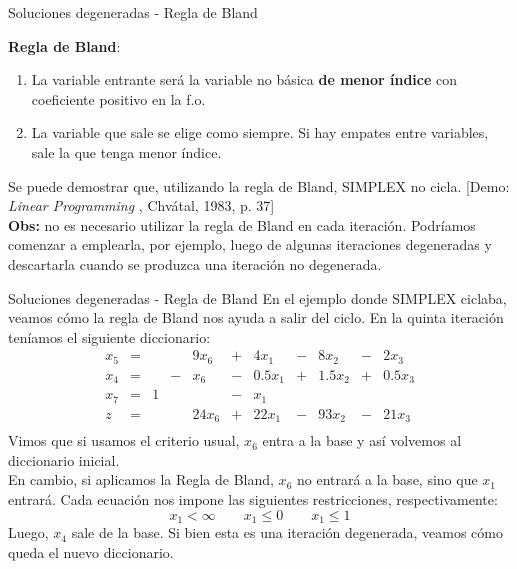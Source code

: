 \documentclass[10pt, aspectratio=169]{beamer}
\begin{document}
\begin{frame}{Soluciones degeneradas - Regla de Bland}
    \begin{tcolorbox}[colback=blue!25!white, colframe=blue!45!white]
        \textbf{Regla de Bland}:
        \begin{enumerate}
            \item La variable entrante será la variable no básica \textbf{de menor índice}
            con coeficiente positivo en la f.o.
            \item
            La variable que sale se elige como siempre. Si hay empates entre variables, sale la que tenga menor índice.
        \end{enumerate}
    \end{tcolorbox}
    \pause
    \vskip 0.5cm
    Se puede demostrar que, utilizando la regla de Bland, SIMPLEX no cicla. [Demo: \textit{Linear Programming}
    , Chvátal, 1983, p. 37]\\
    \vskip 0.2cm
    \textbf{Obs:}
    no es necesario utilizar la regla de Bland en cada iteración. Podríamos comenzar a emplearla, por ejemplo, luego de
    algunas iteraciones degeneradas y descartarla cuando se produzca una iteración no degenerada.
\end{frame}

\begin{frame}{Soluciones degeneradas - Regla de Bland}
    En el ejemplo donde SIMPLEX ciclaba, veamos cómo la regla de Bland nos ayuda a salir del ciclo. En la quinta
    iteración teníamos el siguiente diccionario:
    \[
        \begin{array}{rrrrrrrrrrr}
            x_5 & = &   &   & 9x_6  & + & 4x_1   & - & 8x_2   & - & 2x_3   \\
            x_4 & = &   & - & x_6   & - & 0.5x_1 & + & 1.5x_2 & + & 0.5x_3 \\
            x_7 & = & 1 &   &       & - & x_1    &   &        &   &        \\ \hline
            z   & = &   &   & 24x_6 & + & 22x_1  & - & 93x_2  & - & 21x_3  \\
        \end{array}
    \]
    Vimos que si usamos el criterio usual, $x_6$ entra a la base y así volvemos al diccionario inicial. \\
    En cambio, si aplicamos la Regla de Bland, $x_6$ no entrará a la base, sino que $x_1$
    entrará. Cada ecuación nos impone las siguientes restricciones, respectivamente:
    \[ x_1<\infty \qquad x_1\leq 0 \qquad x_1\leq 1 \]
    Luego, $x_4$ sale de la base. Si bien esta es una iteración degenerada, veamos cómo queda el nuevo diccionario.
\end{frame}
\end{document}
